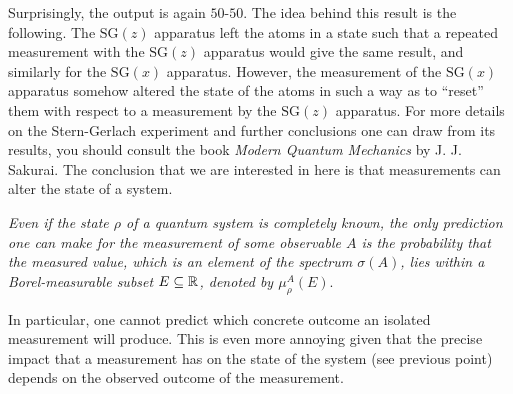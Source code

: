 \begin{center}
\end{center}
Surprisingly, the output is again $50$-$50$. The idea behind this result is the following. The $\mathrm{SG}(z)$ apparatus left the atoms in a state such that a repeated measurement with the $\mathrm{SG}(z)$ apparatus would give the same result, and similarly for the $\mathrm{SG}(x)$ apparatus. However, the measurement of the $\mathrm{SG}(x)$ apparatus somehow altered the state of the atoms in such a way as to ``reset'' them with respect to a measurement by the $\mathrm{SG}(z)$ apparatus. For more details on the Stern-Gerlach experiment and  further conclusions one can draw from its results, you should consult the book \textit{Modern Quantum Mechanics} by J. J. Sakurai. The conclusion that we are interested in here is that measurements can alter the state of a system.

\item \textit{Even if the state $\rho$ of a quantum system is completely known, the only prediction one can make for the measurement of some observable $A$ is the probability that the measured value, which is an element of the spectrum $\sigma(A)$, lies within a Borel-measurable subset $E\subseteq \mathbb{R}$, denoted by
$\mu^A_{\rho}(E)$}.

In particular, one cannot predict which concrete outcome an isolated measurement will produce. This is even more annoying given that the precise impact that a measurement has on the state of the system (see previous point) depends on the observed outcome of the measurement.
\een


